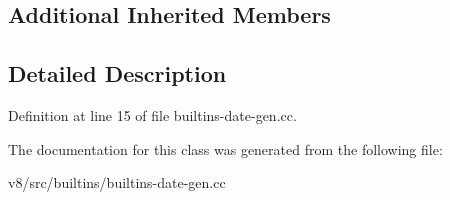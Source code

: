 \subsection*{Additional Inherited Members}


\subsection{Detailed Description}


Definition at line 15 of file builtins-\/date-\/gen.\+cc.



The documentation for this class was generated from the following file\+:\begin{DoxyCompactItemize}
\item 
v8/src/builtins/builtins-\/date-\/gen.\+cc\end{DoxyCompactItemize}
